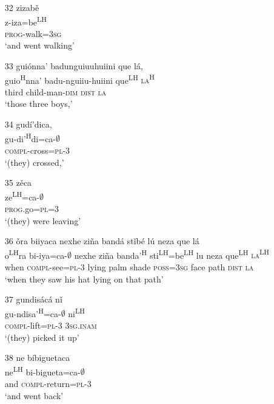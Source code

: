 \begin{itemize}
\item[32]
\glll zizab\v{e}\\
z-iza=be\textsuperscript{LH}\\
\textsc{prog}-walk=\textsc{3sg}\\
\glt `and went walking'


\item[33]
\glll gui\'{o}nna' badunguiuuhuiini que l\'{a},\\
guio\textsuperscript{H}nna' badu-nguiiu-huiini que\textsuperscript{LH} \textsc{la\textsuperscript{H}}\\
third child-man-\textsc{dim} \textsc{dist} \textsc{la}\\
\glt `those three boys,'


\item[34]
\glll gud\'{i}'dica,\\
gu-di'\textsuperscript{H}di=ca-$\emptyset$\\
\textsc{compl}-cross=\textsc{pl}-\textsc{3}\\
\glt `(they) crossed,'


\item[35]
\glll z\v{e}ca\\
ze\textsuperscript{LH}=ca-$\emptyset$\\
\textsc{prog}.go=\textsc{pl}=\textsc{3}\\
\glt `(they) were leaving'
 

\item[36]
\glll \v{o}ra biiyaca nexhe zi\~{n}a band\'{a} st\v{i}b\'{e} l\'{u} neza que l\'{a}\\
o\textsuperscript{LH}ra bi-iya=ca-$\emptyset$ nexhe zi\~{n}a banda'\textsuperscript{H} sti\textsuperscript{LH}=be\textsuperscript{LH} lu neza que\textsuperscript{LH} \textsc{la\textsuperscript{LH}}\\
when \textsc{compl}-see=\textsc{pl}-\textsc{3} lying palm shade \textsc{poss}=\textsc{3sg} face path \textsc{dist} \textsc{la}\\
\glt `when they saw his hat lying on that path'


\item[37]
\glll gundis\'{a}c\'{a} n\v{i}\\
gu-ndisa'\textsuperscript{H}=ca-$\emptyset$ ni\textsuperscript{LH}\\
\textsc{compl}-lift=\textsc{pl}-\textsc{3} \textsc{3sg.inam}\\
\glt `(they) picked it up'


\item[38]
\glll ne b\'{i}biguetaca\\
ne\textsuperscript{LH} bi-bigueta=ca-$\emptyset$\\
and \textsc{compl}-return=\textsc{pl}-\textsc{3}\\
\glt `and went back'



\end{itemize}
